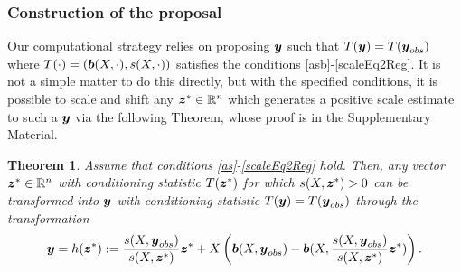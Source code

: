 \documentclass[ba]{imsart}
\newcommand{\by}{\mbox{\boldmath $y$}}
\newcommand{\bz}{\mbox{\boldmath $z$}}
\newcommand{\bb}{\mbox{\boldmath $b$}}
\newtheorem{theorem}{Theorem}[section]
\begin{document}
\subsubsection{Construction of the proposal}
Our computational strategy relies on proposing $\by$ such that $T(\by) = T(\by_{obs})$ where $T(\cdot) = (\bb(X, \cdot), s(X, \cdot))$ satisfies the conditions \ref{asb}-\ref{scaleEq2Reg}. It is not a simple matter to do this directly, but with the specified conditions, it is possible to scale and shift any $\bz^{*} \in \mathbb{R}^{n}$ which generates 
a positive scale estimate to such a $\by$ via the following Theorem, whose proof is in the Supplementary Material. 
\begin{theorem}
\label{Transformation}
Assume that conditions \ref{as}-\ref{scaleEq2Reg} hold.  Then, any vector $\bz^* \in \mathbb{R}^n$ with conditioning statistic
$T(\bz^*)$ for which $s(X,\bz^*) > 0$ can be transformed into $\by$ with conditioning statistic $T(\by) = T(\by_{obs})$ 
through the transformation 
\[
\by = h(\bz^*) := \frac{s(X,\by_{obs})}{s(X,\bz^*)} \bz^* + X\left(\bb(X,\by_{obs}) - \bb(X,\frac{s(X,\by_{obs})}{s(X,\bz^*)} \bz^*)\right) .  
\]
\end{theorem}%
\end{document}
